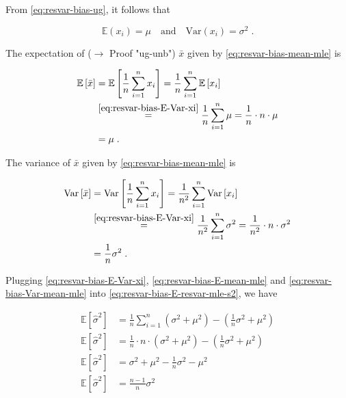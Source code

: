 \documentclass[a4paper,12pt,twoside]{book}
\begin{document}
From \eqref{eq:resvar-bias-ug}, it follows that

\begin{equation} \label{eq:resvar-bias-E-Var-xi}
\mathbb{E}(x_i) = \mu \quad \text{and} \quad \mathrm{Var}(x_i) = \sigma^2 \; .
\end{equation}

The expectation of ($\rightarrow$ Proof "ug-unb") $\bar{x}$ given by \eqref{eq:resvar-bias-mean-mle} is

\begin{equation} \label{eq:resvar-bias-E-mean-mle}
\begin{split}
\mathbb{E}\left[ \bar{x} \right] &= \mathbb{E}\left[ \frac{1}{n} \sum_{i=1}^{n} x_i \right] = \frac{1}{n} \sum_{i=1}^{n} \mathbb{E}\left[ x_i \right] \\
&\overset{\eqref{eq:resvar-bias-E-Var-xi}}{=} \frac{1}{n} \sum_{i=1}^{n} \mu = \frac{1}{n} \cdot n \cdot \mu \\
&= \mu \; .
\end{split}
\end{equation}

The variance of $\bar{x}$ given by \eqref{eq:resvar-bias-mean-mle} is

\begin{equation} \label{eq:resvar-bias-Var-mean-mle}
\begin{split}
\mathrm{Var}\left[ \bar{x} \right] &= \mathrm{Var}\left[ \frac{1}{n} \sum_{i=1}^{n} x_i \right] = \frac{1}{n^2} \sum_{i=1}^{n} \mathrm{Var}\left[ x_i \right] \\
&\overset{\eqref{eq:resvar-bias-E-Var-xi}}{=} \frac{1}{n^2} \sum_{i=1}^{n} \sigma^2 = \frac{1}{n^2} \cdot n \cdot \sigma^2 \\
&= \frac{1}{n} \sigma^2 \; .
\end{split}
\end{equation}

Plugging \eqref{eq:resvar-bias-E-Var-xi}, \eqref{eq:resvar-bias-E-mean-mle} and \eqref{eq:resvar-bias-Var-mean-mle} into \eqref{eq:resvar-bias-E-resvar-mle-s2}, we have

\begin{equation} \label{eq:resvar-bias-E-resvar-mle-s3}
\begin{split}
\mathbb{E}\left[ \hat{\sigma}^2 \right] &= \frac{1}{n} \sum_{i=1}^{n} \left( \sigma^2 + \mu^2 \right) - \left( \frac{1}{n} \sigma^2 + \mu^2 \right) \\
\mathbb{E}\left[ \hat{\sigma}^2 \right] &= \frac{1}{n} \cdot n \cdot \left( \sigma^2 + \mu^2 \right) - \left( \frac{1}{n} \sigma^2 + \mu^2 \right) \\
\mathbb{E}\left[ \hat{\sigma}^2 \right] &= \sigma^2 + \mu^2 - \frac{1}{n} \sigma^2 - \mu^2 \\
\mathbb{E}\left[ \hat{\sigma}^2 \right] &= \frac{n-1}{n} \sigma^2
\end{split}
\end{equation}
\end{document}
